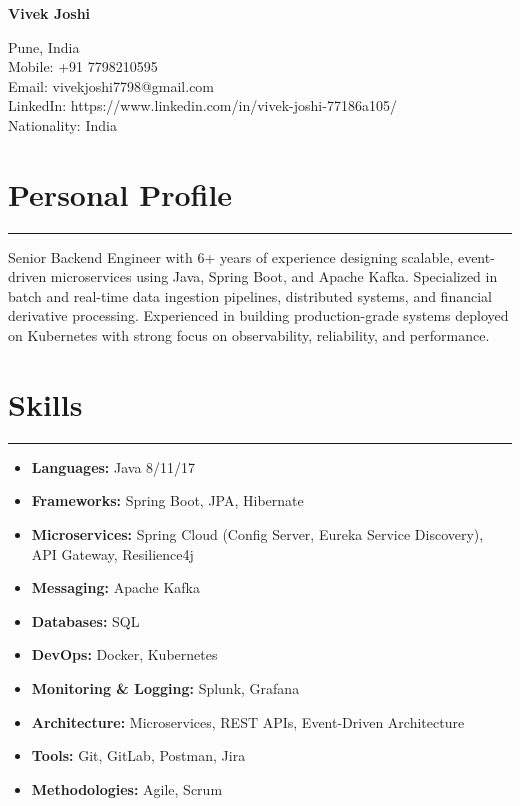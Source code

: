 \documentclass[11pt,a4paper]{article}
\begin{document}
{\Huge \textbf{\textcolor{titleblue}{Vivek Joshi}}} \vspace{0.2em}

Pune, India \\
Mobile: +91 7798210595 \\
Email: vivekjoshi7798@gmail.com \\
LinkedIn: https://www.linkedin.com/in/vivek-joshi-77186a105/ \\
Nationality: India

\vspace{0.4em}

\vspace{0.3cm}
\section*{Personal Profile}
\hrule
\vspace{0.2cm}
\quad Senior Backend Engineer with 6+ years of experience designing scalable, event-driven microservices using Java, Spring Boot, and Apache Kafka. Specialized in batch and real-time data ingestion pipelines, distributed systems, and financial derivative processing. Experienced in building production-grade systems deployed on Kubernetes with strong focus on observability, reliability, and performance.



\vspace{0.3cm}
\section*{Skills}
\hrule
\vspace{0.2cm}

\begin{itemize}[leftmargin=0.15in, label={}]
    \item \textbf{Languages:} Java 8/11/17
    \item \textbf{Frameworks:} Spring Boot, JPA, Hibernate
    \item \textbf{Microservices:} Spring Cloud (Config Server, Eureka Service Discovery), API Gateway, Resilience4j
    \item \textbf{Messaging:} Apache Kafka
    \item \textbf{Databases:} SQL
    \item \textbf{DevOps:} Docker, Kubernetes
    \item \textbf{Monitoring \& Logging:} Splunk, Grafana
    \item \textbf{Architecture:} Microservices, REST APIs, Event-Driven Architecture
    \item \textbf{Tools:} Git, GitLab, Postman, Jira
    \item \textbf{Methodologies:} Agile, Scrum
\end{itemize}
\end{document}
